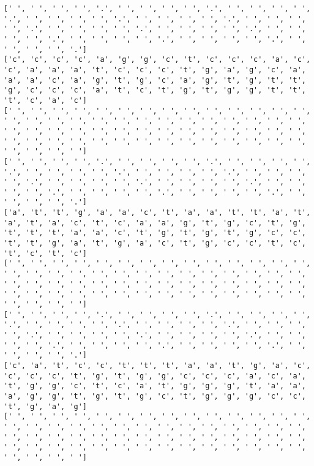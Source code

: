 \documentclass{article}
\begin{document}
\begin{Verbatim}
[' ', ' ', ' ', ' ', '.', ' ', ' ', ' ', ' ', '.', ' ', ' ', ' ', ' ', '.', ' ', ' ', ' ', ' ', '.', ' ', ' ', ' ', ' ', '.', ' ', ' ', ' ', ' ', '.', ' ', ' ', ' ', ' ', '.', ' ', ' ', ' ', ' ', '.', ' ', ' ', ' ', ' ', '.', ' ', ' ', ' ', ' ', '.', ' ', ' ', ' ', ' ', '.', ' ', ' ', ' ', ' ', '.']
['c', 'c', 'c', 'c', 'a', 'g', 'g', 'c', 't', 'c', 'c', 'c', 'a', 'c', 'c', 'a', 'a', 'a', 't', 'c', 'c', 'c', 't', 'g', 'a', 'g', 'c', 'a', 'a', 'a', 'c', 'a', 'g', 't', 'g', 'c', 'a', 'g', 't', 'g', 't', 't', 'g', 'c', 'c', 'c', 'a', 't', 'c', 't', 'g', 't', 'g', 'g', 't', 't', 't', 'c', 'a', 'c']
[' ', ' ', ' ', ' ', ' ', ' ', ' ', ' ', ' ', ' ', ' ', ' ', ' ', ' ', ' ', ' ', ' ', ' ', ' ', ' ', ' ', ' ', ' ', ' ', ' ', ' ', ' ', ' ', ' ', ' ', ' ', ' ', ' ', ' ', ' ', ' ', ' ', ' ', ' ', ' ', ' ', ' ', ' ', ' ', ' ', ' ', ' ', ' ', ' ', ' ', ' ', ' ', ' ', ' ', ' ', ' ', ' ', ' ', ' ', ' ']
[' ', ' ', ' ', ' ', '.', ' ', ' ', ' ', ' ', '.', ' ', ' ', ' ', ' ', '.', ' ', ' ', ' ', ' ', '.', ' ', ' ', ' ', ' ', '.', ' ', ' ', ' ', ' ', '.', ' ', ' ', ' ', ' ', '.', ' ', ' ', ' ', ' ', '.', ' ', ' ', ' ', ' ', '.', ' ', ' ', ' ', ' ', '.', ' ', ' ', ' ', ' ', '.', ' ', ' ', ' ', ' ', '.']
['a', 't', 't', 'g', 'a', 'a', 'c', 't', 'a', 'a', 't', 't', 'a', 't', 'a', 't', 'a', 'c', 't', 'c', 'a', 'a', 'g', 't', 'g', 'c', 't', 'g', 't', 't', 't', 'a', 'a', 'c', 't', 'g', 't', 'g', 't', 'g', 'c', 'c', 't', 't', 'g', 'a', 't', 'g', 'a', 'c', 't', 'g', 'c', 'c', 't', 'c', 't', 'c', 't', 'c']
[' ', ' ', ' ', ' ', ' ', ' ', ' ', ' ', ' ', ' ', ' ', ' ', ' ', ' ', ' ', ' ', ' ', ' ', ' ', ' ', ' ', ' ', ' ', ' ', ' ', ' ', ' ', ' ', ' ', ' ', ' ', ' ', ' ', ' ', ' ', ' ', ' ', ' ', ' ', ' ', ' ', ' ', ' ', ' ', ' ', ' ', ' ', ' ', ' ', ' ', ' ', ' ', ' ', ' ', ' ', ' ', ' ', ' ', ' ', ' ']
[' ', ' ', ' ', ' ', '.', ' ', ' ', ' ', ' ', '.', ' ', ' ', ' ', ' ', '.', ' ', ' ', ' ', ' ', '.', ' ', ' ', ' ', ' ', '.', ' ', ' ', ' ', ' ', '.', ' ', ' ', ' ', ' ', '.', ' ', ' ', ' ', ' ', '.', ' ', ' ', ' ', ' ', '.', ' ', ' ', ' ', ' ', '.', ' ', ' ', ' ', ' ', '.', ' ', ' ', ' ', ' ', '.']
['c', 'a', 't', 'c', 'c', 't', 't', 't', 'a', 'a', 't', 'g', 'a', 'c', 'c', 'c', 'c', 't', 'g', 't', 'g', 'g', 'c', 'c', 'c', 'a', 'c', 'a', 't', 'g', 'g', 'c', 't', 'c', 'a', 't', 'g', 'g', 'g', 't', 'a', 'a', 'a', 'g', 'g', 't', 'g', 't', 'g', 'c', 't', 'g', 'g', 'g', 'c', 'c', 't', 'g', 'a', 'g']
[' ', ' ', ' ', ' ', ' ', ' ', ' ', ' ', ' ', ' ', ' ', ' ', ' ', ' ', ' ', ' ', ' ', ' ', ' ', ' ', ' ', ' ', ' ', ' ', ' ', ' ', ' ', ' ', ' ', ' ', ' ', ' ', ' ', ' ', ' ', ' ', ' ', ' ', ' ', ' ', ' ', ' ', ' ', ' ', ' ', ' ', ' ', ' ', ' ', ' ', ' ', ' ', ' ', ' ', ' ', ' ', ' ', ' ', ' ', ' ']

\end{Verbatim}
\end{document}
